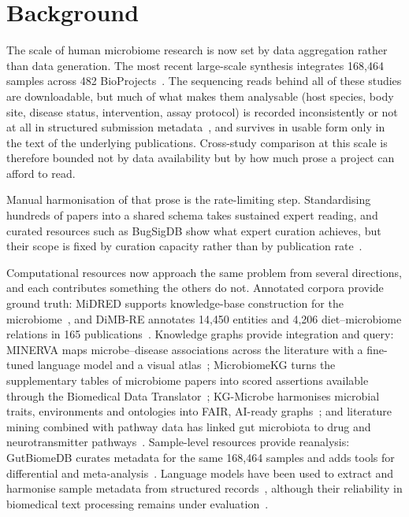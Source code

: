 \documentclass[referee,lineno,pdflatex,sn-vancouver-num]{sn-jnl}
\theoremstyle{thmstyleone}%
\theoremstyle{thmstyletwo}%
\theoremstyle{thmstylethree}%
\begin{document}

\maketitle

\section{Background}\label{sec:intro}

The scale of human microbiome research is now set by data aggregation rather than
data generation. The most recent large-scale synthesis integrates 168,464 samples
across 482 BioProjects~\cite{abdill2025}. The sequencing reads behind all of these
studies are downloadable, but much of what makes them analysable (host species,
body site, disease status, intervention, assay protocol) is recorded
inconsistently or not at all in structured submission metadata~\cite{goncalves2019},
and survives in usable form only in the text of the underlying publications.
Cross-study comparison at this scale is therefore bounded not by data availability
but by how much prose a project can afford to read.

Manual harmonisation of that prose is the rate-limiting step. Standardising hundreds
of papers into a shared schema takes sustained expert reading, and curated
resources such as BugSigDB show what expert curation achieves, but their scope is
fixed by curation capacity rather than by
publication rate~\cite{geistlinger2023}.

Computational resources now approach the same problem from several
directions, and each contributes something the others do not. Annotated
corpora provide ground truth: MiDRED supports knowledge-base construction for
the microbiome~\cite{hogan2024midred}, and DiMB-RE annotates 14,450 entities
and 4,206 diet--microbiome relations in 165 publications~\cite{hong2025dimbre}.
Knowledge graphs provide integration and query: MINERVA maps microbe--disease
associations across the literature with a fine-tuned language model and a
visual atlas~\cite{langarica2025minerva}; MicrobiomeKG turns the supplementary
tables of microbiome papers into scored assertions available through the
Biomedical Data Translator~\cite{goetz2025microbiomekg}; KG-Microbe harmonises
microbial traits, environments and ontologies into FAIR, AI-ready
graphs~\cite{santangelo2026kgmicrobe}; and literature mining combined with
pathway data has linked gut microbiota to drug and neurotransmitter
pathways~\cite{liu2024mikg}. Sample-level resources provide reanalysis:
GutBiomeDB curates metadata for the same 168,464 samples and adds tools for
differential and meta-analysis~\cite{zhai2026gutbiomedb}. Language models have
been used to extract and harmonise sample metadata from structured
records~\cite{ikeda2025biosample,higashi2024harmonization}, although their
reliability in biomedical text processing remains under
evaluation~\cite{chen2025llmbench}.
\end{document}
